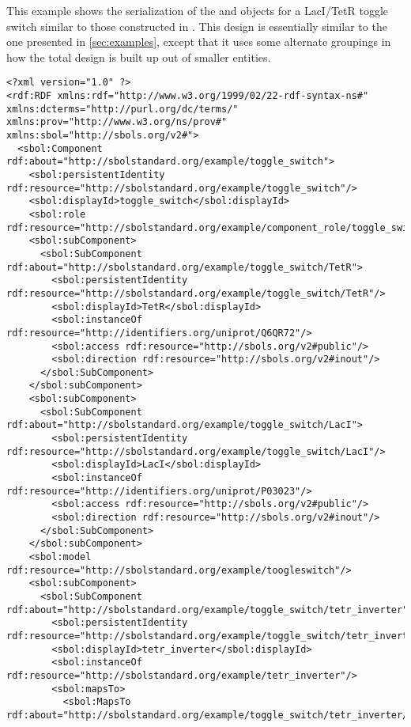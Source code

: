This example shows the serialization of the  and  objects for a LacI/TetR toggle switch similar to those constructed in \cite{Gardner2000}.  
This design is essentially similar to the one presented in \ref{sec:examples}, except that it uses some alternate groupings in how the total design is built up out of smaller entities.

\label{ser:toggleswitch}
\begin{lstlisting}
<?xml version="1.0" ?>
<rdf:RDF xmlns:rdf="http://www.w3.org/1999/02/22-rdf-syntax-ns#" xmlns:dcterms="http://purl.org/dc/terms/" xmlns:prov="http://www.w3.org/ns/prov#" xmlns:sbol="http://sbols.org/v2#">
  <sbol:Component rdf:about="http://sbolstandard.org/example/toggle_switch">
    <sbol:persistentIdentity rdf:resource="http://sbolstandard.org/example/toggle_switch"/>
    <sbol:displayId>toggle_switch</sbol:displayId>
    <sbol:role rdf:resource="http://sbolstandard.org/example/component_role/toggle_switch"/>
    <sbol:subComponent>
      <sbol:SubComponent rdf:about="http://sbolstandard.org/example/toggle_switch/TetR">
        <sbol:persistentIdentity rdf:resource="http://sbolstandard.org/example/toggle_switch/TetR"/>
        <sbol:displayId>TetR</sbol:displayId>
        <sbol:instanceOf rdf:resource="http://identifiers.org/uniprot/Q6QR72"/>
        <sbol:access rdf:resource="http://sbols.org/v2#public"/>
        <sbol:direction rdf:resource="http://sbols.org/v2#inout"/>
      </sbol:SubComponent>
    </sbol:subComponent>
    <sbol:subComponent>
      <sbol:SubComponent rdf:about="http://sbolstandard.org/example/toggle_switch/LacI">
        <sbol:persistentIdentity rdf:resource="http://sbolstandard.org/example/toggle_switch/LacI"/>
        <sbol:displayId>LacI</sbol:displayId>
        <sbol:instanceOf rdf:resource="http://identifiers.org/uniprot/P03023"/>
        <sbol:access rdf:resource="http://sbols.org/v2#public"/>
        <sbol:direction rdf:resource="http://sbols.org/v2#inout"/>
      </sbol:SubComponent>
    </sbol:subComponent>
    <sbol:model rdf:resource="http://sbolstandard.org/example/toogleswitch"/>
    <sbol:subComponent>
      <sbol:SubComponent rdf:about="http://sbolstandard.org/example/toggle_switch/tetr_inverter">
        <sbol:persistentIdentity rdf:resource="http://sbolstandard.org/example/toggle_switch/tetr_inverter"/>
        <sbol:displayId>tetr_inverter</sbol:displayId>
        <sbol:instanceOf rdf:resource="http://sbolstandard.org/example/tetr_inverter"/>
        <sbol:mapsTo>
          <sbol:MapsTo rdf:about="http://sbolstandard.org/example/toggle_switch/tetr_inverter/TetR_mapping">

\end{lstlisting}
